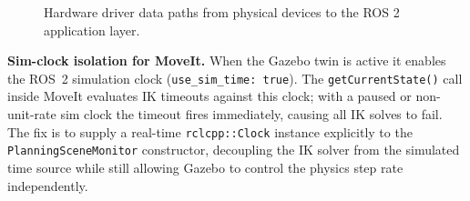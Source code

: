 \begin{figure}[H]
{%
    }
    \caption{Hardware driver data paths from physical devices to the ROS 2 application layer.}
    \label{fig:ch6_driver_integration}
\end{figure}

\textbf{Sim-clock isolation for MoveIt.} When the Gazebo twin is active it enables the ROS~2 simulation clock
(\texttt{use\_sim\_time:~true}).  The \texttt{getCurrentState()} call inside MoveIt evaluates
IK timeouts against this clock; with a paused or non-unit-rate sim clock the timeout fires
immediately, causing all IK solves to fail.  The fix is to supply a real-time
\texttt{rclcpp::Clock} instance explicitly to the \texttt{PlanningSceneMonitor} constructor,
decoupling the IK solver from the simulated time source while still allowing Gazebo to control
the physics step rate independently.